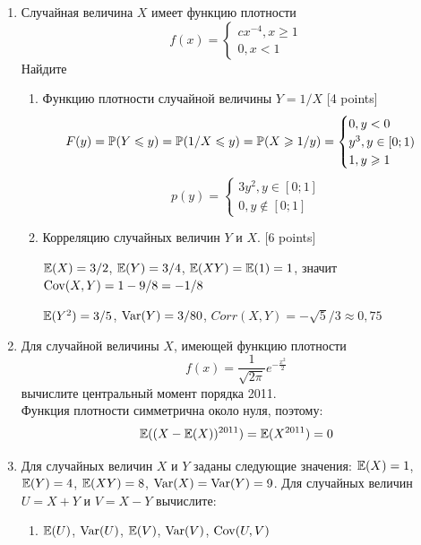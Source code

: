 \documentclass[12pt, a4paper]{article}\usepackage[]{graphicx}\usepackage[]{color}
\begin{document}
\begin{enumerate}
\item Случайная величина $X$ имеет функцию плотности
\begin{equation}
f(x)=
\begin{cases}
    cx^{-4}, x\geq 1 \\
    0, x<1
\end{cases}
\end{equation}
Найдите
\begin{enumerate}
\item  Функцию плотности случайной величины $Y=1/X$ [4 points]
\begin{equation}
F(y)=\P(Y\leq y)=\P(1/X \leq y)=\P(X\geq 1/y)=
\begin{cases}
0, y<0 \\
y^3, y\in [0;1) \\
1, y \geq 1
\end{cases}
\end{equation}
\begin{equation}
p(y)=
\begin{cases}
3y^2, y\in [0;1]\\
0, y\notin [0;1]
\end{cases}
\end{equation}


\item  Корреляцию случайных величин $Y$ и $X$. [6 points]


$\E(X)=3/2$, $\E(Y)=3/4$, $\E(XY)=\E(1)=1$, значит $\Cov(X,Y)=1-9/8=-1/8$

$\E(Y^2)=3/5$, $\Var(Y)=3/80$, $Corr(X,Y)=-\sqrt{5}/3\approx 0{,}75$
\end{enumerate}

\item Для случайной величины $X$, имеющей функцию плотности
\begin{equation}
f(x)=\frac{1}{\sqrt{2\pi}}e^{-\frac{x^2}{2}}
\end{equation}
вычислите центральный момент порядка 2011.\\
Функция плотности симметрична около нуля, поэтому:
\begin{equation}
\E((X-\E(X))^{2011})=\E(X^{2011})=0
\end{equation}


\item Для случайных величин $X$ и $Y$ заданы следующие значения: $\E(X)=1$, $\E(Y)=4$, $\E(XY)=8$, $\Var(X)=\Var(Y)=9$. Для случайных величин $U=X+Y$ и $V=X-Y$ вычислите:
\begin{enumerate}
\item $\E(U)$, $\Var(U)$, $\E(V)$, $\Var(V)$, $\Cov(U,V)$ \\


\end{enumerate}
\end{enumerate}
\end{document}
